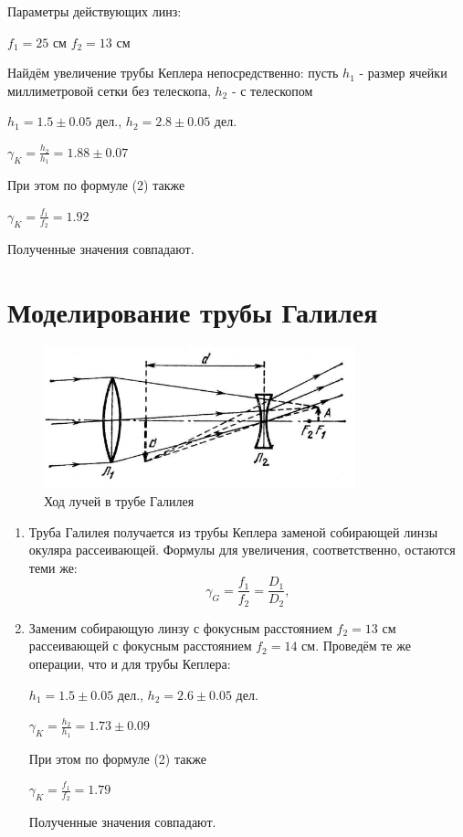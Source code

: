 \begin{enumerate}
Параметры действующих линз:
\begin{center}
    $f_1 = 25$ см \hspace{1cm} $f_2 = 13$ см
\end{center}

Найдём увеличение трубы Кеплера непосредственно: пусть $h_1$ - размер ячейки миллиметровой сетки без телескопа, $h_2$ - с телескопом
\begin{center}
$h_1 = 1.5\pm0.05$ дел., \hspace{1cm} $h_2 = 2.8\pm0.05$ дел. \par
$\gamma_K = \frac{h_2}{h_1} = 1.88\pm0.07$
\end{center}

При этом по формуле (2) также
\begin{center}
    $\gamma_K = \frac{f_1}{f_2} = 1.92$
\end{center}

Полученные значения совпадают.
\end{enumerate}

\section*{Моделирование трубы Галилея}
    \begin{figure}[h]
    \centering
    \includegraphics[width=9cm]{gal.PNG}
    \caption{Ход лучей в трубе Галилея}
    \label{fig:vac}
\end{figure}

\begin{enumerate}
    \item Труба Галилея получается из трубы Кеплера заменой собирающей линзы окуляра рассеивающей. Формулы для увеличения, соответственно, остаются теми же:
\begin{equation}
    \gamma_G = \frac{f_1}{f_2} = \frac{D_1}{D_2},
\end{equation}

\item Заменим собирающую линзу с фокусным расстоянием $f_2 = 13$ см рассеивающей с фокусным расстоянием $f_2 = 14$ см. Проведём те же операции, что и для трубы Кеплера:

\begin{center}
$h_1 = 1.5\pm0.05$ дел., \hspace{1cm} $h_2 = 2.6\pm0.05$ дел. \par
$\gamma_K = \frac{h_2}{h_1} = 1.73\pm0.09$
\end{center}

При этом по формуле (2) также
\begin{center}
    $\gamma_K = \frac{f_1}{f_2} = 1.79$
\end{center}

Полученные значения совпадают.
\end{enumerate}

